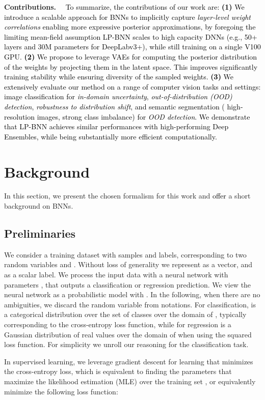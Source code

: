 \documentclass[10pt,twocolumn,letterpaper]{article}
\newcommand{\ab}[1]{\textcolor{black}{#1}}
\newcommand{\parag}[1]{\smallskip\noindent\textbf{#1}~~}
\begin{document}
\parag{Contributions.} \ab{To summarize, the contributions of our
work are: \textbf{(1)} We introduce a scalable approach for BNNs to implicitly capture \emph{layer-level weight correlations} enabling more expressive posterior approximations, by foregoing the limiting mean-field assumption 
LP-BNN scales to high capacity DNNs (e.g., 50+ layers and 30M parameters for DeepLabv3+), while still training on a single V100 GPU. \textbf{(2)} We propose to leverage VAEs for computing the posterior distribution of the weights by projecting them in the latent space. This improves significantly training stability while ensuring diversity of the sampled weights. \textbf{(3)} We extensively evaluate our method on a range of computer vision tasks and settings: image classification for \emph{in-domain uncertainty},
\emph{out-of-distribution (OOD) detection}, 
\emph{robustness to distribution shift}, 
and semantic segmentation ( high-resolution images, strong class imbalance) for \emph{OOD detection}.
We demonstrate that LP-BNN achieves similar performances with high-performing Deep Ensembles, while being substantially more efficient computationally.  } \section{Background}\label{section:background}
In this section, we present the chosen formalism for this work and \ab{offer} a short background on BNNs.

\subsection{Preliminaries}
We consider a training dataset  with  samples and labels, corresponding to two random variables  and . 
Without loss of generality we represent  as a vector, and 
as a scalar label. We process the input data  with a neural network  with parameters , that outputs a classification or regression prediction. We view the neural network as a probabilistic model with . In the following, when there are no ambiguities, we discard the random variable from notations. For classification,  is a categorical distribution over the set of classes over {the domain of} , typically corresponding to the cross-entropy loss function, while for regression   is a Gaussian distribution of real values  over {the domain of}  when using the squared loss function.
For simplicity 
we unroll our reasoning for the classification task.


In supervised learning, we leverage gradient descent for learning  that minimizes the cross-entropy loss, which is equivalent to finding the parameters that maximize the likelihood estimation (MLE)  over the training set , or equivalently minimize the following loss function: 
\end{document}

